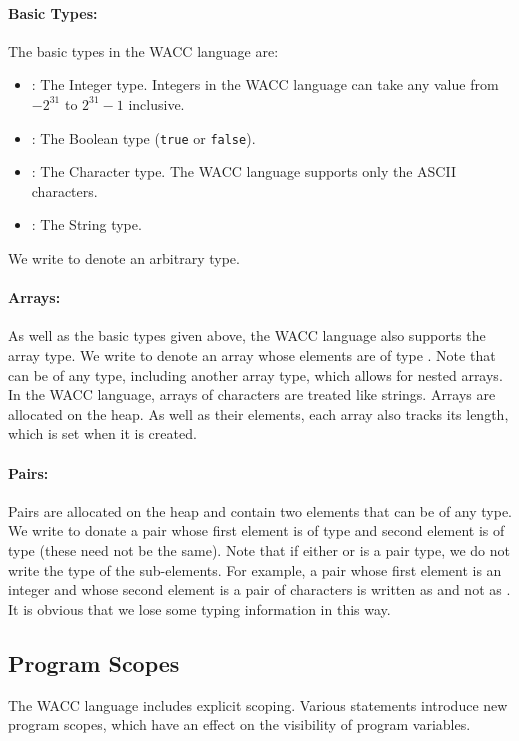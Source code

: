 \documentclass[a4paper]{article}
\newcommand{\shell}[1]{\lstinline{#1}}
\theoremstyle{definition}
\begin{document}
\paragraph{Basic Types:} 
The basic types in the WACC language are:
\begin{itemize}
 \item {}: The Integer type. Integers in the WACC language can take any value from $-2^{31}$ to $2^{31} - 1$ inclusive.
 \item {}: The Boolean type (\shell{true} or \shell{false}).
 \item {}: The Character type. The WACC language supports only the ASCII characters.
 \item {}: The String type. 
\end{itemize}
We write  to denote an arbitrary type.

\paragraph{Arrays:} 
As well as the basic types given above, the WACC language also supports the array type.
We write  to denote an array whose elements are of type .
Note that  can be of any type, including another array type, which allows for nested arrays.
In the WACC language, arrays of characters are treated like strings.
Arrays are allocated on the heap.
As well as their elements, each array also tracks its length, which is set when it is created.
 
\paragraph{Pairs:}
Pairs are allocated on the heap and contain two elements that can be of any type. 
We write  to donate a pair whose first element is of type  and second element is of type  
(these need not be the same). 
Note that if either  or  is a pair type, we do not write the type of the sub-elements. 
For example, a pair whose first element is an integer
and whose second element is a pair of characters is written as  and not as . 
It is obvious that we lose some typing information in this way. 

\subsection{Program Scopes}
The WACC language includes explicit scoping.
Various statements introduce new program scopes, which have an effect on the visibility of program variables.
\end{document}
